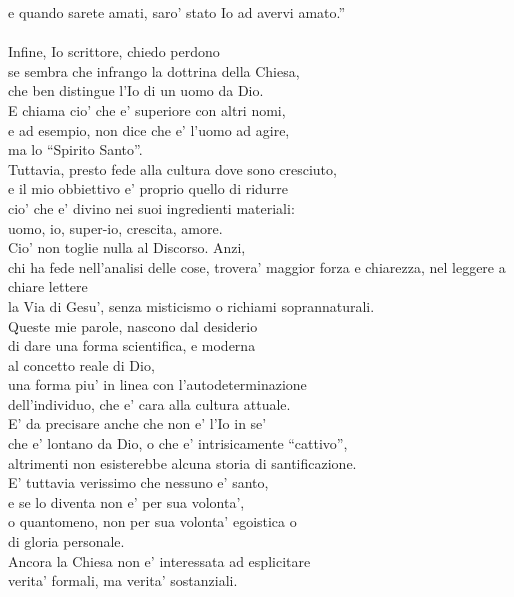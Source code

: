\begin{haiku}
    e quando sarete amati, saro' stato Io ad avervi amato.''\\
    \leavevmode\\
    Infine, Io scrittore, chiedo perdono \\
    se sembra che infrango la dottrina della Chiesa,\\
    che ben distingue l'Io di un uomo da Dio. \\
    E chiama cio' che e' superiore con altri nomi, \\
    e ad esempio, non dice  che e' l'uomo ad agire,\\
    ma lo ``Spirito Santo''.\\
    Tuttavia, presto fede alla cultura dove sono cresciuto,\\
    e il mio obbiettivo e' proprio quello di ridurre \\
    cio' che e' divino nei suoi ingredienti materiali: \\
    uomo, io, super-io, crescita, amore. \\
    Cio' non toglie nulla al Discorso. Anzi,\\ 
    chi ha fede nell'analisi delle cose, trovera' 
    maggior forza e chiarezza, nel leggere a chiare lettere\\
    la Via di Gesu', senza misticismo o richiami soprannaturali.\\
    Queste mie parole, nascono dal desiderio \\
    di dare una forma scientifica, e moderna \\
    al concetto reale di Dio,\\
    una forma piu' in linea con l'autodeterminazione\\
    dell'individuo, che e' cara alla cultura attuale.\\
    E' da precisare anche che non e' l'Io in se'\\
    che e' lontano da Dio, o che e' intrisicamente ``cattivo'',\\
    altrimenti non esisterebbe alcuna storia di santificazione.\\
    E' tuttavia verissimo che nessuno e' santo,\\
    e se lo diventa non e' per sua volonta',\\
    o quantomeno, non per sua volonta' egoistica o \\
    di gloria personale.\\
    Ancora la Chiesa non e' interessata ad esplicitare\\
    verita' formali, ma verita' sostanziali.\\

\end{haiku}
